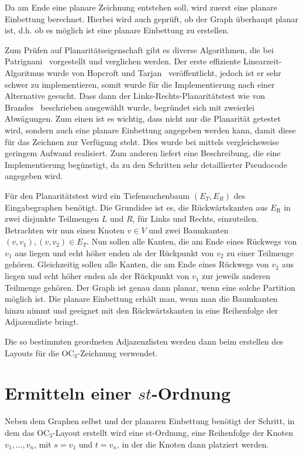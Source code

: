 \documentclass[a4paper]{scrreprt}
\theoremstyle{definition}
\begin{document}
Da am Ende eine planare Zeichnung entstehen soll, wird zuerst eine planare Einbettung berechnet. Hierbei wird auch geprüft, ob der Graph überhaupt planar ist, d.h. ob es möglich ist eine planare Einbettung zu erstellen. 

Zum Prüfen auf Planaritätseigenschaft gibt es diverse Algorithmen, die bei Patrignani~\cite{patrignani-07} vorgestellt und verglichen werden. Der erste effiziente Linearzeit-Algoritmus wurde von Hopcroft und Tarjan~\cite{hopcroft+tarjan-74} veröffentlicht, jedoch ist er sehr schwer zu implementieren, somit wurde für die Implementierung nach einer Alternative gesucht. Dass dann der Links-Rechts-Planaritätstest wie von Brandes~\cite{brandes-09} beschrieben ausgewählt wurde, begründet sich mit zweierlei Abwägungen. Zum einen ist es wichtig, dass nicht nur die Planarität getestet wird, sondern auch eine planare Einbettung angegeben werden kann, damit diese für das Zeichnen zur Verfügung steht. Dies wurde bei \cite{brandes-09} mittels vergleichsweise geringem Aufwand realisiert. Zum anderen liefert \cite{brandes-09} eine Beschreibung, die eine Implementierung begünstigt, da zu den Schritten sehr detaillierter Pseudocode angegeben wird. %

Für den Planaritätstest wird ein Tiefensuchenbaum $(E_T, E_R)$ des Eingabegraphen benötigt. Die Grundidee ist es, die Rückwärtskanten aus $E_\text{R}$ in zwei disjunkte Teilmengen $L$ und $R$, für Links und Rechts, einzuteilen. Betrachten wir nun einen Knoten $v \in V$ und zwei Baumkanten $(v, v_1), (v, v_2) \in E_T$. Nun sollen alle Kanten, die am Ende eines Rückwegs von $v_1$ aus liegen und echt höher enden als der Rückpunkt von $v_2$ zu einer Teilmenge gehören. Gleichzeitig sollen alle Kanten, die am Ende eines Rückwegs von $v_2$ aus liegen und echt höher enden als der Rückpunkt von $v_1$ zur jeweils anderen Teilmenge gehören. Der Graph ist genau dann planar, wenn eine solche Partition möglich ist. Die planare Einbettung erhält man, wenn man die Baumkanten hinzu nimmt und geeignet mit den Rückwärtskanten in eine Reihenfolge der Adjazenzliste bringt.

Die so bestimmten geordneten Adjazenzlisten werden dann beim erstellen des Layouts für die OC$_3$-Zeichnung verwendet.

\section{Ermitteln einer $st$-Ordnung}

Neben dem Graphen selbst und der planaren Einbettung benötigt der Schritt, in dem das OC$_3$-Layout erstellt wird eine st-Ordnung, eine Reihenfolge der Knoten $v_1, \dots, v_n$, mit $s=v_1$ und $t=v_n$, in der die Knoten dann platziert werden. 
\end{document}
